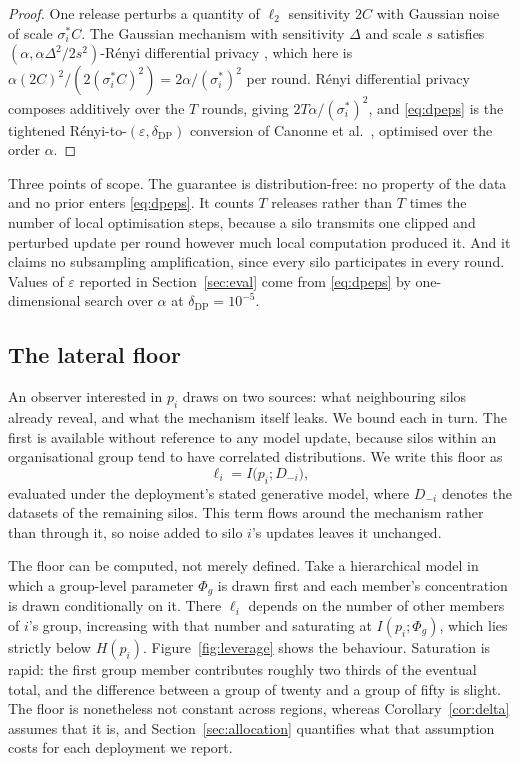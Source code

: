 \documentclass[acmsmall,screen,review,anonymous]{acmart}
\theoremstyle{acmdefinition}%
\begin{document}
\begin{proof}
One release perturbs a quantity of $\ell_2$ sensitivity $2C$ with Gaussian noise of
scale $\sigma^{\ast}_i C$. The Gaussian mechanism with sensitivity $\Delta$ and
scale $s$ satisfies $(\alpha, \alpha \Delta^2 / 2s^2)$-R\'enyi differential privacy
\cite{mironov2017rdp}, which here is $\alpha (2C)^2 / (2 (\sigma^{\ast}_i C)^2) =
2\alpha/(\sigma^{\ast}_i)^2$ per round. R\'enyi differential privacy composes
additively over the $T$ rounds, giving $2 T \alpha/(\sigma^{\ast}_i)^2$, and
\eqref{eq:dpeps} is the tightened R\'enyi-to-$(\varepsilon,
\delta_{\mathrm{DP}})$ conversion of Canonne et al.\ \cite{canonne2020discrete},
optimised over the order $\alpha$.
\end{proof}

Three points of scope. The guarantee is distribution-free: no property of the data
and no prior enters \eqref{eq:dpeps}. It counts $T$ releases rather than $T$ times
the number of local optimisation steps, because a silo transmits one clipped and
perturbed update per round however much local computation produced it. And it
claims no subsampling amplification, since every silo participates in every round.
Values of $\varepsilon$ reported in Section~\ref{sec:eval} come from
\eqref{eq:dpeps} by one-dimensional search over $\alpha$ at $\delta_{\mathrm{DP}} =
10^{-5}$.

\subsection{The lateral floor}

An observer interested in $p_i$ draws on two sources: what neighbouring silos
already reveal, and what the mechanism itself leaks. We bound each in turn. The
first is available without reference to any model update, because silos within an
organisational group tend to have correlated distributions. We write this floor as
\begin{equation}
\ell_i = I\big(p_i ; D_{-i}\big),
\end{equation}
evaluated under the deployment's stated generative model, where $D_{-i}$ denotes
the datasets of the remaining silos. This term flows around the mechanism rather
than through it, so noise added to silo $i$'s updates leaves it unchanged.

The floor can be computed, not merely defined. Take a hierarchical model in which a
group-level parameter $\Phi_g$ is drawn first and each member's concentration is drawn
conditionally on it. There $\ell_i$ depends on the number of other members of $i$'s
group, increasing with that number and saturating at $I(p_i ; \Phi_g)$, which lies
strictly below $H(p_i)$. Figure~\ref{fig:leverage} shows the behaviour. Saturation is
rapid: the first group member contributes roughly two thirds of the eventual total,
and the difference between a group of twenty and a group of fifty is slight. The floor
is nonetheless not constant across regions, whereas Corollary~\ref{cor:delta} assumes
that it is, and Section~\ref{sec:allocation} quantifies what that assumption costs for
each deployment we report.
\end{document}
